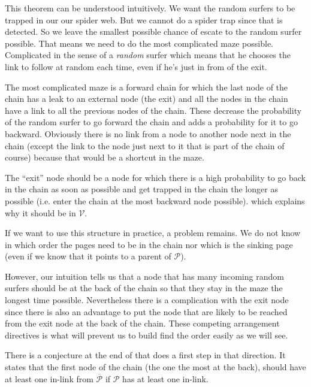 \documentclass{article}
\newcommand{\1}{\mathbf{1}}
\theoremstyle{definition}
\begin{document}
This theorem can be understood intuitively.
We want the random surfers to be trapped in our our spider web.
But we cannot do a spider trap since that is detected.
So we leave the smallest possible chance of escate to the random surfer possible.
That means we need to do the most complicated maze possible.
Complicated in the sense of a \emph{random} surfer which means that he chooses
the link to follow at random each time, even if he's just in from of the exit.

The most complicated maze is a forward chain for which the last node of the chain has a leak to an external node (the exit)
and all the nodes in the chain have a link to all the previous nodes of the chain.
These decrease the probability of the random surfer to go forward the chain and adds a probability for it to go backward.
Obviously there is no link from a node to another node next in the chain (except the link to the node just next to it that is part of the chain of course) because that would be a shortcut in the maze.

The ``exit'' node should be a node for which there is a high probability to go back in the chain as soon as possible and get trapped in the chain the longer as possible (i.e. enter the chain at the most backward node possible).
which explains why it should be in $\mathcal{V}$.

If we want to use this structure in practice, a problem remains.
We do not know in which order the pages need to be in the chain
nor which is the sinking page (even if we know that it points to a parent of \(\mathcal{P}\)).

However, our intuition tells us that a node that has many incoming random surfers should be at the back
of the chain so that they stay in the maze the longest time possible.
Nevertheless there is a complication with the exit node since there is also an advantage to put the node that are
likely to be reached from the exit node at the back of the chain.
These competing arrangement directives is what will prevent us to build find the order easily as we will see.

There is a conjecture at the end of \cite{de2008maximizing} that does a first step in that direction.
It states that the first node of the chain (the one the most at the back), should have at least one in-link from $\overline{\mathcal{P}}$
if $\mathcal{P}$ has at least one in-link.
\end{document}

